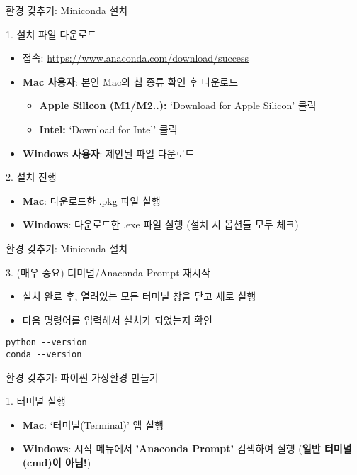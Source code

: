 \documentclass[11pt, aspectratio=169]{beamer}
\begin{document}
\begin{frame}[t]{환경 갖추기: Miniconda 설치}
  \begin{block}{1. 설치 파일 다운로드}
    \begin{itemize}
        \item 접속: \url{https://www.anaconda.com/download/success}
        \item \textbf{Mac 사용자}: 본인 Mac의 칩 종류 확인 후 다운로드
        \begin{itemize}
            \item \textbf{Apple Silicon (M1/M2..):} `Download for Apple Silicon' 클릭
            \item \textbf{Intel:} `Download for Intel' 클릭
        \end{itemize}
        \item \textbf{Windows 사용자}: 제안된 파일 다운로드
    \end{itemize}
  \end{block}  
  \begin{block}{2. 설치 진행}
    \begin{itemize}
        \item \textbf{Mac}: 다운로드한 .pkg 파일 실행
        \item \textbf{Windows}: 다운로드한 .exe 파일 실행 (설치 시 옵션들 모두 체크)
    \end{itemize}    
  \end{block}
\end{frame}

\begin{frame}[t, fragile]{환경 갖추기: Miniconda 설치}
  \begin{block}{3. (매우 중요) 터미널/Anaconda Prompt 재시작}
    \begin{itemize}
        \item 설치 완료 후, 열려있는 모든 터미널 창을 닫고 새로 실행
        \item 다음 명령어를 입력해서 설치가 되었는지 확인
    \end{itemize}   
  \end{block}
  \begin{verbatim}
python --version
conda --version
  \end{verbatim}
\end{frame}

\begin{frame}[t,fragile]{환경 갖추기: 파이썬 가상환경 만들기}
  \begin{block}{1. 터미널 실행}
    \begin{itemize}
        \item \textbf{Mac}: `터미널(Terminal)' 앱 실행
        \item \textbf{Windows}: 시작 메뉴에서 \textbf{'Anaconda Prompt'} 검색하여 실행 (\textbf{일반 터미널(cmd)이 아님!})
    \end{itemize}    
  \end{block}
\end{frame}
\end{document}
